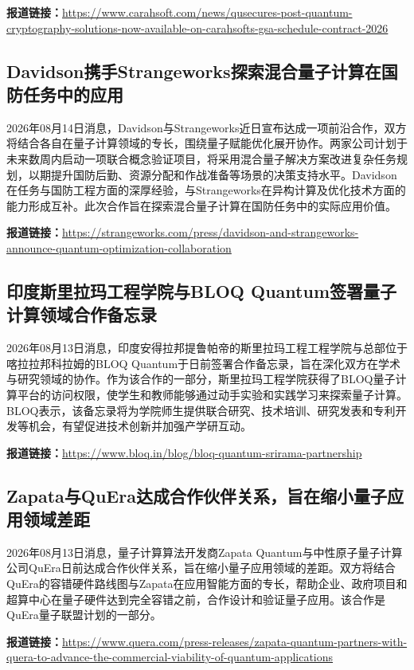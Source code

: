 \documentclass[12pt,a4paper]{ctexart}
\begin{document}
\noindent\textbf{报道链接：}\url{https://www.carahsoft.com/news/qusecures-post-quantum-cryptography-solutions-now-available-on-carahsofts-gsa-schedule-contract-2026}

\subsection{ Davidson携手Strangeworks探索混合量子计算在国防任务中的应用 }

2026年08月14日消息，Davidson与Strangeworks近日宣布达成一项前沿合作，双方将结合各自在量子计算领域的专长，围绕量子赋能优化展开协作。两家公司计划于未来数周内启动一项联合概念验证项目，将采用混合量子解决方案改进复杂任务规划，以期提升国防后勤、资源分配和作战准备等场景的决策支持水平。Davidson在任务与国防工程方面的深厚经验，与Strangeworks在异构计算及优化技术方面的能力形成互补。此次合作旨在探索混合量子计算在国防任务中的实际应用价值。

\noindent\textbf{报道链接：}\url{https://strangeworks.com/press/davidson-and-strangeworks-announce-quantum-optimization-collaboration}

\subsection{ 印度斯里拉玛工程学院与BLOQ Quantum签署量子计算领域合作备忘录 }

2026年08月13日消息，印度安得拉邦提鲁帕帝的斯里拉玛工程工程学院与总部位于喀拉拉邦科拉姆的BLOQ Quantum于日前签署合作备忘录，旨在深化双方在学术与研究领域的协作。作为该合作的一部分，斯里拉玛工程学院获得了BLOQ量子计算平台的访问权限，使学生和教师能够通过动手实验和实践学习来探索量子计算。BLOQ表示，该备忘录将为学院师生提供联合研究、技术培训、研究发表和专利开发等机会，有望促进技术创新并加强产学研互动。

\noindent\textbf{报道链接：}\url{https://www.bloq.in/blog/bloq-quantum-srirama-partnership}

\subsection{ Zapata与QuEra达成合作伙伴关系，旨在缩小量子应用领域差距 }

2026年08月13日消息，量子计算算法开发商Zapata Quantum与中性原子量子计算公司QuEra日前达成合作伙伴关系，旨在缩小量子应用领域的差距。双方将结合QuEra的容错硬件路线图与Zapata在应用智能方面的专长，帮助企业、政府项目和超算中心在量子硬件达到完全容错之前，合作设计和验证量子应用。该合作是QuEra量子联盟计划的一部分。

\noindent\textbf{报道链接：}\url{https://www.quera.com/press-releases/zapata-quantum-partners-with-quera-to-advance-the-commercial-viability-of-quantum-applications}
\end{document}
